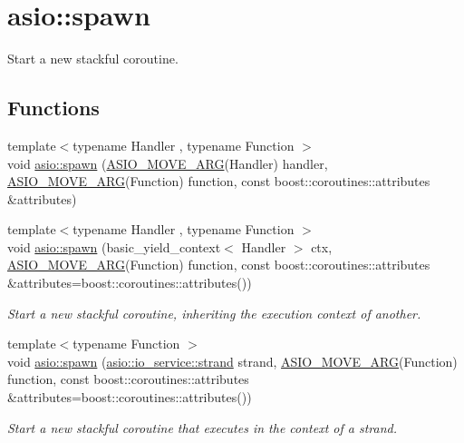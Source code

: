\hypertarget{group__spawn}{}\section{asio\+:\+:spawn}
\label{group__spawn}


Start a new stackful coroutine.  


\subsection*{Functions}
\begin{DoxyCompactItemize}
\item 
{\footnotesize template$<$typename Handler , typename Function $>$ }\\void \hyperlink{group__spawn_ga4f2228347a699338928b72b60b52e345}{asio\+::spawn} (\hyperlink{config_8hpp_a4a0e0a3e374fd7362ab5590338533950}{A\+S\+I\+O\+\_\+\+M\+O\+V\+E\+\_\+\+A\+R\+G}(Handler) handler, \hyperlink{config_8hpp_a4a0e0a3e374fd7362ab5590338533950}{A\+S\+I\+O\+\_\+\+M\+O\+V\+E\+\_\+\+A\+R\+G}(Function) function, const boost\+::coroutines\+::attributes \&attributes)
\item 
{\footnotesize template$<$typename Handler , typename Function $>$ }\\void \hyperlink{group__spawn_ga96a673b1867f7983c6701bb0dc658c36}{asio\+::spawn} (basic\+\_\+yield\+\_\+context$<$ Handler $>$ ctx, \hyperlink{config_8hpp_a4a0e0a3e374fd7362ab5590338533950}{A\+S\+I\+O\+\_\+\+M\+O\+V\+E\+\_\+\+A\+R\+G}(Function) function, const boost\+::coroutines\+::attributes \&attributes=boost\+::coroutines\+::attributes())
\begin{DoxyCompactList}\small\item\em Start a new stackful coroutine, inheriting the execution context of another. \end{DoxyCompactList}\item 
{\footnotesize template$<$typename Function $>$ }\\void \hyperlink{group__spawn_ga832418b551fda9707d57eadcbb40142c}{asio\+::spawn} (\hyperlink{classasio_1_1io__service_1_1strand}{asio\+::io\+\_\+service\+::strand} strand, \hyperlink{config_8hpp_a4a0e0a3e374fd7362ab5590338533950}{A\+S\+I\+O\+\_\+\+M\+O\+V\+E\+\_\+\+A\+R\+G}(Function) function, const boost\+::coroutines\+::attributes \&attributes=boost\+::coroutines\+::attributes())
\begin{DoxyCompactList}\small\item\em Start a new stackful coroutine that executes in the context of a strand. \end{DoxyCompactList}\item 

\end{DoxyCompactItemize}
